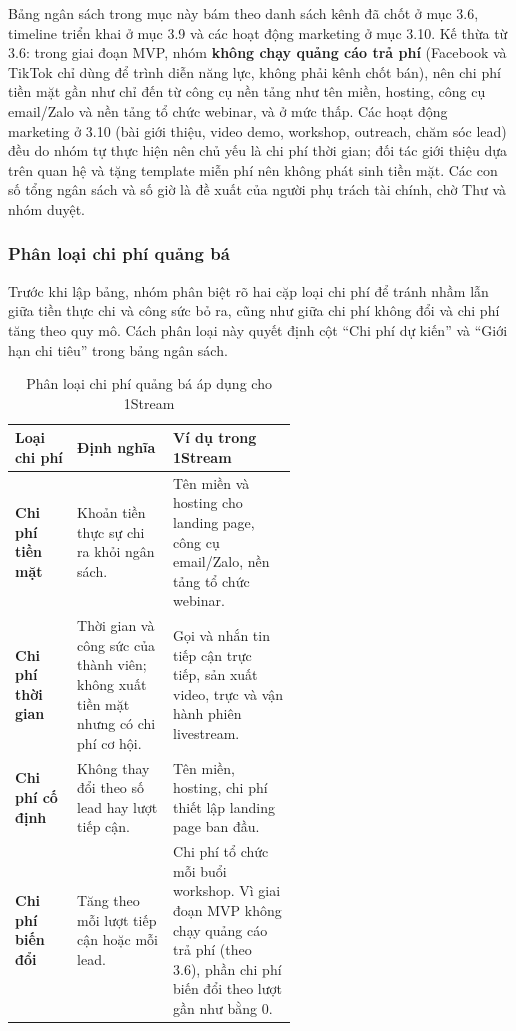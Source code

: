Bảng ngân sách trong mục này bám theo danh sách kênh đã chốt ở mục 3.6, timeline triển khai ở mục 3.9 và các hoạt động marketing ở mục 3.10. Kế thừa từ 3.6: trong giai đoạn MVP, nhóm \textbf{không chạy quảng cáo trả phí} (Facebook và TikTok chỉ dùng để trình diễn năng lực, không phải kênh chốt bán), nên chi phí tiền mặt gần như chỉ đến từ công cụ nền tảng như tên miền, hosting, công cụ email/Zalo và nền tảng tổ chức webinar, và ở mức thấp. Các hoạt động marketing ở 3.10 (bài giới thiệu, video demo, workshop, outreach, chăm sóc lead) đều do nhóm tự thực hiện nên chủ yếu là chi phí thời gian; đối tác giới thiệu dựa trên quan hệ và tặng template miễn phí nên không phát sinh tiền mặt. Các con số tổng ngân sách và số giờ là đề xuất của người phụ trách tài chính, chờ Thư và nhóm duyệt.

\subsubsection{Phân loại chi phí quảng bá}

Trước khi lập bảng, nhóm phân biệt rõ hai cặp loại chi phí để tránh nhầm lẫn giữa tiền thực chi và công sức bỏ ra, cũng như giữa chi phí không đổi và chi phí tăng theo quy mô. Cách phân loại này quyết định cột ``Chi phí dự kiến'' và ``Giới hạn chi tiêu'' trong bảng ngân sách.

\begin{table}[H]
    \centering
    \footnotesize
    \setlength{\tabcolsep}{4pt}
    \renewcommand{\arraystretch}{1.3}
    \caption{Phân loại chi phí quảng bá áp dụng cho 1Stream}
    \label{tab:pa3-ns-phanloai}
    \begin{tabularx}{\linewidth}{@{}L{0.22\linewidth} L{0.34\linewidth} Y@{}}
        \toprule
        \textbf{Loại chi phí} & \textbf{Định nghĩa} & \textbf{Ví dụ trong 1Stream} \\ \midrule
        \textbf{Chi phí tiền mặt} & Khoản tiền thực sự chi ra khỏi ngân sách. & Tên miền và hosting cho landing page, công cụ email/Zalo, nền tảng tổ chức webinar. \\
        \textbf{Chi phí thời gian} & Thời gian và công sức của thành viên; không xuất tiền mặt nhưng có chi phí cơ hội. & Gọi và nhắn tin tiếp cận trực tiếp, sản xuất video, trực và vận hành phiên livestream. \\
        \textbf{Chi phí cố định} & Không thay đổi theo số lead hay lượt tiếp cận. & Tên miền, hosting, chi phí thiết lập landing page ban đầu. \\
        \textbf{Chi phí biến đổi} & Tăng theo mỗi lượt tiếp cận hoặc mỗi lead. & Chi phí tổ chức mỗi buổi workshop. Vì giai đoạn MVP không chạy quảng cáo trả phí (theo 3.6), phần chi phí biến đổi theo lượt gần như bằng 0. \\
        \bottomrule
    \end{tabularx}
\end{table}

